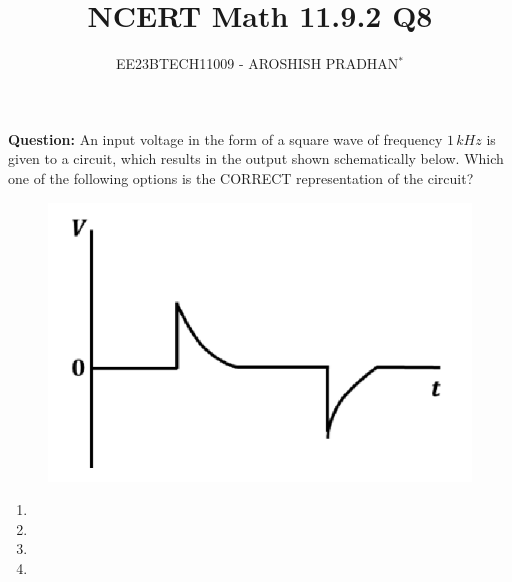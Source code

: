 \documentclass[journal,12pt,twocolumn]{IEEEtran}
\theoremstyle{remark}
\begin{document}

\vspace{3cm}

\title{NCERT Math 11.9.2 Q8}
\author{EE23BTECH11009 - AROSHISH PRADHAN$^{*}$%
}
\maketitle
\newpage
\bigskip
\textbf{Question:} An input voltage in the form of a square wave of frequency $1\, kHz$ is given to a circuit, which results in the output shown schematically below. Which one of the following options is the CORRECT representation of the circuit?

\begin{figure}[!h]
    \centering
    \includegraphics[width = \columnwidth]{2023/PH/37/figs/question.png}
    \caption{}
    \label{fig:ques_gate.ph.23.37}
\end{figure}

\begin{enumerate}[label = (\alph*)]
    \item
    \begin{minipage}[t]{\columnwidth}
        
    \end{minipage}
    \item
    \begin{minipage}[t]{\columnwidth}
        
    \end{minipage}
    \item
    \begin{minipage}[t]{\columnwidth}
        
    \end{minipage}
    \item
    \begin{minipage}[t]{\columnwidth}
        
    \end{minipage}
\end{enumerate}
\end{document}
